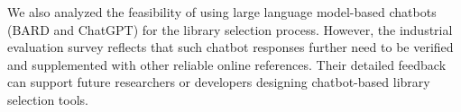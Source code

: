 We also analyzed the feasibility of using large language model-based chatbots (BARD and ChatGPT) for the library selection process. However, the industrial evaluation survey reflects that such chatbot responses further need to be verified and supplemented with other reliable online references. Their detailed feedback can support future researchers or developers designing chatbot-based library selection tools.







